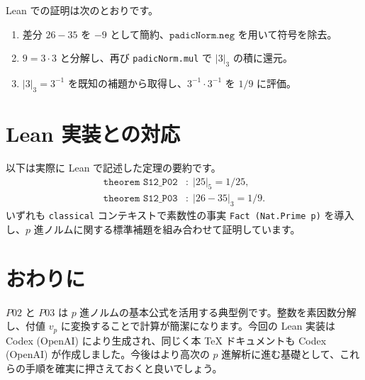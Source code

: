 \documentclass{ltjsarticle}
\begin{document}
Lean での証明は次のとおりです。
\begin{enumerate}
  \item 差分 $26 - 35$ を $-9$ として簡約、$\texttt{padicNorm.neg}$ を用いて符号を除去。
  \item $9 = 3 \cdot 3$ と分解し、再び \texttt{padicNorm.mul} で $\lvert 3\rvert_3$ の積に還元。
  \item $\lvert 3\rvert_3 = 3^{-1}$ を既知の補題から取得し、$3^{-1} \cdot 3^{-1}$ を $1/9$ に評価。
\end{enumerate}

\section{Lean 実装との対応}
以下は実際に Lean で記述した定理の要約です。
\begin{align*}
  \texttt{theorem\ S12\_P02} &: \; \lvert 25\rvert_5 = 1/25,\\
  \texttt{theorem\ S12\_P03} &: \; \lvert 26 - 35\rvert_3 = 1/9.
\end{align*}
いずれも \texttt{classical} コンテキストで素数性の事実 \texttt{Fact (Nat.Prime p)} を導入し、$p$ 進ノルムに関する標準補題を組み合わせて証明しています。

\section{おわりに}
$P02$ と $P03$ は $p$ 進ノルムの基本公式を活用する典型例です。整数を素因数分解し、付値 $v_p$ に変換することで計算が簡潔になります。今回の Lean 実装は Codex (OpenAI) により生成され、同じく本 TeX ドキュメントも Codex (OpenAI) が作成しました。今後はより高次の $p$ 進解析に進む基礎として、これらの手順を確実に押さえておくと良いでしょう。
\end{document}

